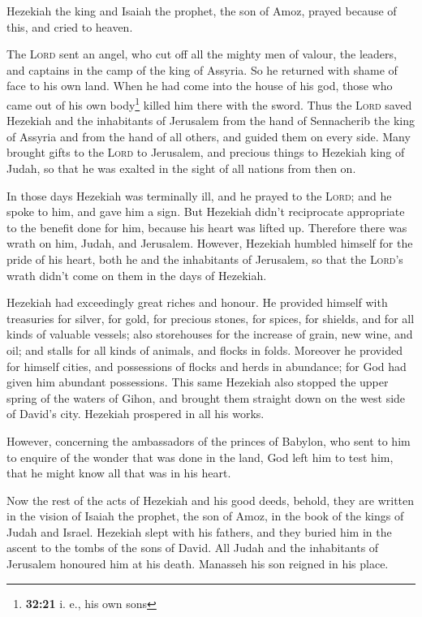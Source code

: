  Hezekiah the king and Isaiah the prophet, the son of
Amoz, prayed because of this, and cried to heaven.

 The \textsc{Lord} sent an angel, who cut off all the
mighty men of valour, the leaders, and captains in the camp of the king
of Assyria. So he returned with shame of face to his own land. When he
had come into the house of his god, those who came out of his own
body\footnote{\textbf{32:21} i. e., his own sons} killed him there with
the sword.  Thus the \textsc{Lord} saved Hezekiah and the
inhabitants of Jerusalem from the hand of Sennacherib the king of
Assyria and from the hand of all others, and guided them on every side.
 Many brought gifts to the \textsc{Lord} to Jerusalem,
and precious things to Hezekiah king of Judah, so that he was exalted in
the sight of all nations from then on.

 In those days Hezekiah was terminally ill, and he prayed
to the \textsc{Lord}; and he spoke to him, and gave him a sign.
 But Hezekiah didn't reciprocate appropriate to the
benefit done for him, because his heart was lifted up. Therefore there
was wrath on him, Judah, and Jerusalem.  However,
Hezekiah humbled himself for the pride of his heart, both he and the
inhabitants of Jerusalem, so that the \textsc{Lord}'s wrath didn't come
on them in the days of Hezekiah.

 Hezekiah had exceedingly great riches and honour. He
provided himself with treasuries for silver, for gold, for precious
stones, for spices, for shields, and for all kinds of valuable vessels;
 also storehouses for the increase of grain, new wine,
and oil; and stalls for all kinds of animals, and flocks in folds.
 Moreover he provided for himself cities, and possessions
of flocks and herds in abundance; for God had given him abundant
possessions.  This same Hezekiah also stopped the upper
spring of the waters of Gihon, and brought them straight down on the
west side of David's city. Hezekiah prospered in all his works.

 However, concerning the ambassadors of the princes of
Babylon, who sent to him to enquire of the wonder that was done in the
land, God left him to test him, that he might know all that was in his
heart.

 Now the rest of the acts of Hezekiah and his good deeds,
behold, they are written in the vision of Isaiah the prophet, the son of
Amoz, in the book of the kings of Judah and Israel. 
Hezekiah slept with his fathers, and they buried him in the ascent to
the tombs of the sons of David. All Judah and the inhabitants of
Jerusalem honoured him at his death. Manasseh his son reigned in his
place.

